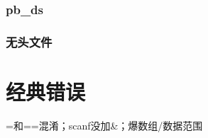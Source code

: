 \documentclass[10pt]{article}
\begin{document}
\subsubsection{pb\_ds}

\subsubsection{无头文件}

\section{经典错误}
=和==混淆；scanf没加\&；爆数组/数据范围
\end{document}

